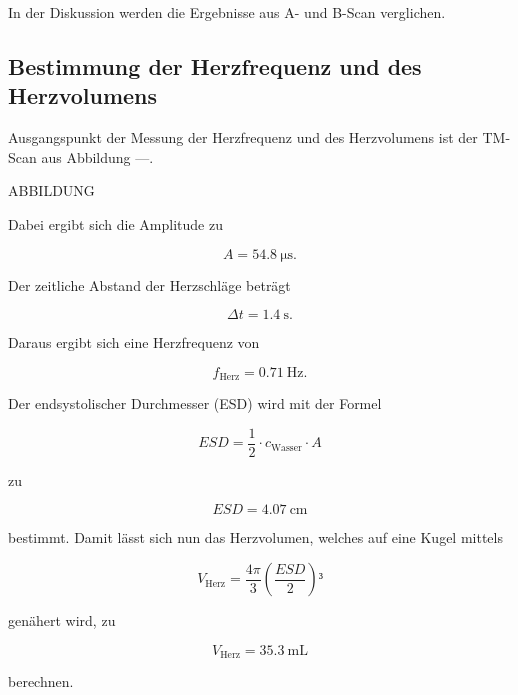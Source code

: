 In der Diskussion werden die Ergebnisse aus A- und B-Scan verglichen.

\subsection{Bestimmung der Herzfrequenz und des Herzvolumens}

Ausgangspunkt der Messung der Herzfrequenz und des Herzvolumens ist der TM-Scan aus 
Abbildung ---. 

ABBILDUNG 

Dabei ergibt sich die Amplitude zu

\begin{equation*}
A = \SI{54.8}{\micro\second}.
\end{equation*}

Der zeitliche Abstand der Herzschläge beträgt 

\begin{equation*}
\Delta t = \SI{1.4}{\second}.
\end{equation*}

Daraus ergibt sich eine Herzfrequenz von 

\begin{equation*}
f_\text{Herz} = \SI{0.71}{\hertz}.
\end{equation*}

Der endsystolischer Durchmesser (ESD) wird mit der Formel 

\begin{equation}
ESD = \frac{1}{2}\cdot c_\text{Wasser} \cdot A
\end{equation}

zu

\begin{equation*}
ESD = \SI{4.07}{\centi\meter}
\end{equation*}

bestimmt. Damit lässt sich nun das Herzvolumen, welches auf eine Kugel mittels 

\begin{equation*}
V_\text{Herz} = \frac{4\pi}{3}\left(\frac{ESD}{2}\right)³
\end{equation*}

genähert wird, zu 

\begin{equation*}
V_\text{Herz} = \SI{35.3}{\milli\liter}
\end{equation*}

berechnen. 